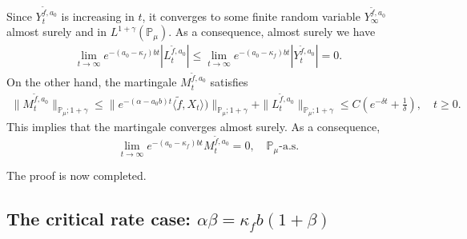 \documentclass[12pt,a4paper]{amsart}
\theoremstyle{plain}
\theoremstyle{definition}
\numberwithin{equation}{section}
\begin{document}
Since $Y_t^{\tilde{f},a_0}$ is increasing in $t$, it converges to some finite random variable $Y_{\infty}^{\tilde{f},a_0}$ almost surely and in $L^{1+\gamma}(\mathbb{P}_{\mu})$.
	As a consequence, almost surely we have
\begin{align*}
    \lim_{t\rightarrow \infty}e^{-(a_0 - \kappa_f)bt}|L_t^{\tilde{f},a_0}|
    \leq  \lim_{t\rightarrow \infty}e^{-(a_0 - \kappa_f)bt}|Y_t^{\tilde{f},a_0}|=0.
\end{align*}
	On the other hand, the martingale $M_t^{\tilde{f},a_0}$ satisfies
\begin{align*}
    \|M_t^{\tilde{f},a_0}\|_{\mathbb{P}_{\mu};1+\gamma}\leq  \|e^{-(\alpha-a_0 b)t}\langle \tilde{f},X_t\rangle)\|_{\mathbb{P}_{\mu};1+\gamma}+\|L_t^{\tilde{f},a_0}\|_{\mathbb{P}_{\mu};1+\gamma}\leq C(e^{-\delta t}+\frac{1}{\delta}),\quad t\geq 0.
\end{align*}
	This implies that the martingale converges almost surely.
	As a consequence,
\[
	\lim_{t\rightarrow\infty} e^{-(a_0-\kappa_f)bt}M_t^{\tilde{f},a_0}
	=0,
	\quad \mathbb P_\mu\text{-a.s.}
\]
	
	The proof is now completed.

\subsection{The critical rate case: $\alpha\beta=\kappa_fb(1+\beta)$}
\end{document}
